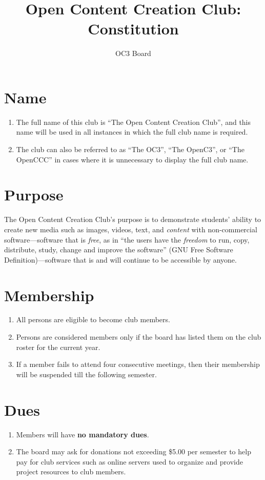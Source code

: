 \documentclass[10pt,letterpaper]{article}
\author{OC3 Board}
\title{Open Content Creation Club: Constitution}
\begin{document}
	\maketitle
	
	\section{Name}
	\begin{enumerate}[label=(\alph*)]
		\item The full name of this club is ``The Open Content Creation Club'', and this name will be used in all instances in which the full club name is required.
		\item The club can also be referred to as ``The OC3'', ``The OpenC3'', or ``The OpenCCC'' in cases where it is unnecessary to display the full club name.
	\end{enumerate}
	
	\section{Purpose}
	The Open Content Creation Club's purpose is to demonstrate students' ability to create new media such as images, videos, text, and \emph{content} with non-commercial software---software that is \emph{free}, as in ``the users have the \emph{freedom} to run, copy, distribute, study, change and improve the software'' (GNU Free Software Definition)---software that is and will continue to be accessible by anyone.
	
	\section{Membership}
	\begin{enumerate}[label=(\alph*)]
		\item All persons are eligible to become club members.
		\item Persons are considered members only if the board has listed them on the club roster for the current year.
		\item If a member fails to attend four consecutive meetings, then their membership will be suspended till the following semester.
	\end{enumerate}
	
	\section{Dues}
	\begin{enumerate}[label=(\alph*)]
		\item Members will have \textbf{no mandatory dues}.
		\item The board may ask for donations not exceeding \$5.00 per semester to help pay for club services such as online servers used to organize and provide project resources to club members.
	\end{enumerate}
	
\end{document}
